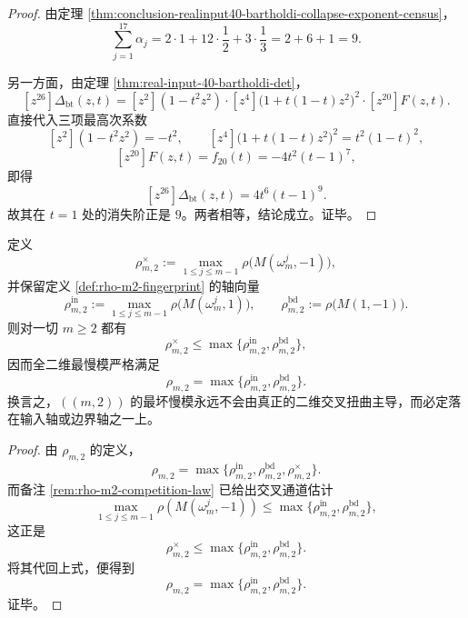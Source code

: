\begin{proof}
由定理 \ref{thm:conclusion-realinput40-bartholdi-collapse-exponent-census}，
\[
\sum_{j=1}^{17}\alpha_j
=
2\cdot 1+12\cdot \frac12+3\cdot \frac13
=
2+6+1
=
9.
\]

另一方面，由定理 \ref{thm:real-input-40-bartholdi-det}，
\[
[z^{26}]\Delta_{\mathrm{bt}}(z,t)
=
[z^2](1-t^2z^2)\cdot[z^4]\bigl(1+t(1-t)z^2\bigr)^2\cdot[z^{20}]F(z,t).
\]
直接代入三项最高次系数
\[
[z^2](1-t^2z^2)=-t^2,\qquad
[z^4]\bigl(1+t(1-t)z^2\bigr)^2=t^2(1-t)^2,
\]
\[
[z^{20}]F(z,t)=f_{20}(t)=-4t^2(t-1)^7,
\]
即得
\[
[z^{26}]\Delta_{\mathrm{bt}}(z,t)
=
4t^6(t-1)^9.
\]
故其在 \(t=1\) 处的消失阶正是 \(9\)。两者相等，结论成立。证毕。
\end{proof}
\begin{theorem}\label{thm:conclusion-rho-m2-cross-twist-exclusion}
定义
\[
\rho^{\times}_{m,2}:=
\max_{1\le j\le m-1}\rho\bigl(M(\omega_m^j,-1)\bigr),
\]
并保留定义 \ref{def:rho-m2-fingerprint} 的轴向量
\[
\rho^{\mathrm{in}}_{m,2}
:=
\max_{1\le j\le m-1}\rho\bigl(M(\omega_m^j,1)\bigr),
\qquad
\rho^{\mathrm{bd}}_{m,2}
:=
\rho\bigl(M(1,-1)\bigr).
\]
则对一切 \(m\ge 2\) 都有
\[
\rho^{\times}_{m,2}
\le
\max\{\rho^{\mathrm{in}}_{m,2},\rho^{\mathrm{bd}}_{m,2}\},
\]
因而全二维最慢模严格满足
\[
\rho_{m,2}
=
\max\{\rho^{\mathrm{in}}_{m,2},\rho^{\mathrm{bd}}_{m,2}\}.
\]
换言之，\(((m,2))\) 的最坏慢模永远不会由真正的二维交叉扭曲主导，而必定落在输入轴或边界轴之一上。
\end{theorem}
\begin{proof}
由 \(\rho_{m,2}\) 的定义，
\[
\rho_{m,2}
=
\max\{\rho^{\mathrm{in}}_{m,2},\rho^{\mathrm{bd}}_{m,2},\rho^{\times}_{m,2}\}.
\]
而备注 \ref{rem:rho-m2-competition-law} 已给出交叉通道估计
\[
\max_{1\le j\le m-1}\rho\!\left(M(\omega_m^j,-1)\right)
\le
\max\{\rho^{\mathrm{in}}_{m,2},\rho^{\mathrm{bd}}_{m,2}\},
\]
这正是
\[
\rho^{\times}_{m,2}
\le
\max\{\rho^{\mathrm{in}}_{m,2},\rho^{\mathrm{bd}}_{m,2}\}.
\]
将其代回上式，便得到
\[
\rho_{m,2}
=
\max\{\rho^{\mathrm{in}}_{m,2},\rho^{\mathrm{bd}}_{m,2}\}.
\]
证毕。
\end{proof}
